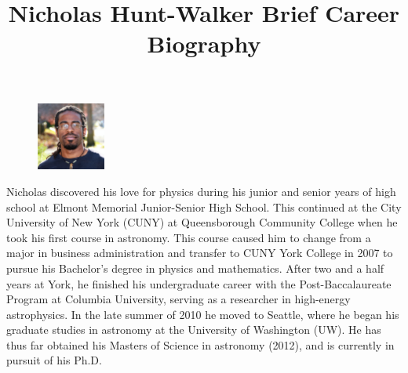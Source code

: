 \documentclass[12pt]{article}
\begin{document}
\title{Nicholas Hunt-Walker Brief Career Biography}
\maketitle

\begin{figure}
\vspace{-15pt}
\includegraphics[width=0.2\textwidth]{profile.jpg}
\vspace{-10pt}
\end{figure}
\noindent Nicholas discovered his love for physics during his junior and senior years of high school at Elmont Memorial Junior-Senior High School. This continued at the City University of New York (CUNY) at Queensborough Community College when he took his first course in astronomy. This course caused him to change from a major in business administration and transfer to CUNY York College in 2007 to pursue his Bachelor's degree in physics and mathematics. After two and a half years at York, he finished his undergraduate career with the Post-Baccalaureate Program at Columbia University, serving as a researcher in high-energy astrophysics.  In the late summer of 2010 he moved to Seattle, where he began his graduate studies in astronomy at the University of Washington (UW). He has thus far obtained his Masters of Science in astronomy (2012), and is currently in pursuit of his Ph.D.\\
\end{document}

